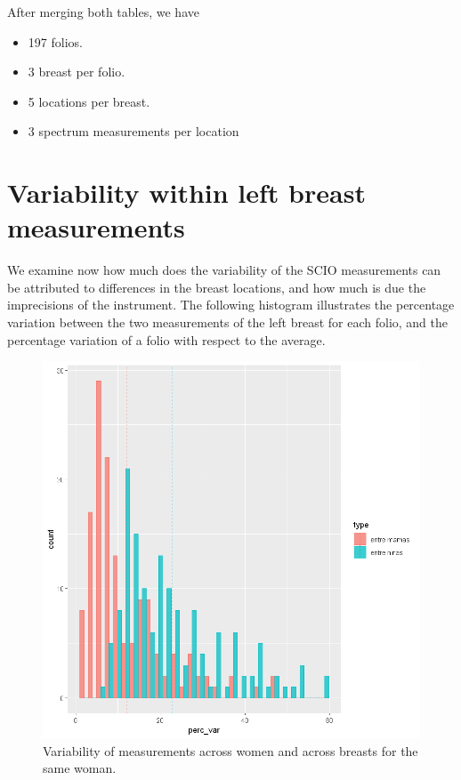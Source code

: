 \documentclass[letterpaper,11pt]{article}
\begin{document}
After merging both tables, we have
\begin{itemize}
	\item 197 folios.
	\item 3 breast per folio.
	\item 5 locations per breast.
	\item 3 spectrum measurements per location
\end{itemize}

\section*{Variability within left breast measurements}
We examine now how much does the variability of the SCIO measurements can be attributed to differences in the breast locations, and how much is due the imprecisions of the instrument. The following histogram illustrates the percentage variation between the two measurements of the left breast for each folio, and the percentage variation of a folio with respect to the average.


\begin{figure}[ht!]
	\centering
	\includegraphics[trim={0 0cm 0cm 0}, clip, scale=0.55]{figures/variability_histogram.png}
	\caption{Variability of measurements across women and across breasts for the same woman.} 
	\label{fig:variability}
\end{figure}
\end{document}
